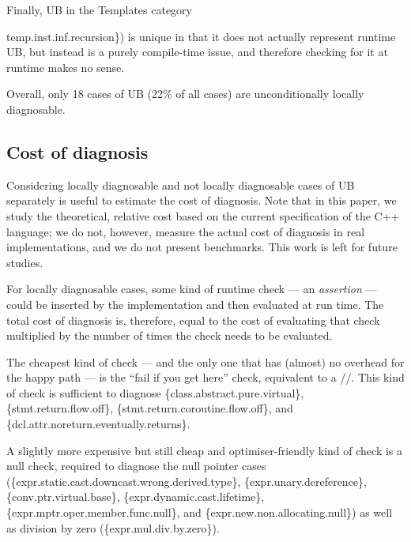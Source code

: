 Finally, UB in the Templates category {temp.inst.inf.recursion\}) is unique in that it does not actually represent runtime UB, but instead is a purely compile-time issue, and therefore checking for it at runtime makes no sense.

Overall, only 18 cases of UB (22\% of all cases) are unconditionally locally diagnosable.

\subsection{Cost of diagnosis}
\label{cost}

Considering locally diagnosable and not locally diagnosable cases of UB separately is useful to estimate the cost of diagnosis. Note that in this paper, we study the theoretical, relative cost based on the current specification of the C++ language; we do not, however, measure the actual cost of diagnosis in real implementations, and we do not present benchmarks. This work is left for future studies. %

For locally diagnosable cases, some kind of runtime check --- an \emph{assertion} --- could be inserted by the implementation and then evaluated at run time. The total cost of diagnosis is, therefore, equal to the cost of evaluating that check multiplied by the number of times the check needs to be evaluated.

The cheapest kind of check --- and the only one that has (almost) no overhead for the happy path --- is the ``fail if you get here'' check, equivalent to a //. This kind of check is sufficient to diagnose \{class.abstract.pure.virtual\}, \{stmt.return.flow.off\}, \{stmt.return.coroutine.flow.off\}, and \{dcl.attr.noreturn.eventually.returns\}.

A slightly more expensive but still cheap and optimiser-friendly kind of check is a null check, required to diagnose the null pointer cases  
(\{expr.static.cast.downcast.wrong.derived.type\},
\{expr.unary.deref\-erence\},
\{conv.ptr.virtual.base\},
\{expr.dynamic.cast.lifetime\}, 
\{expr.mptr.oper.member.\linebreak[3]func.null\}, and
\{expr.new.non.allocating.null\})
as well as division by zero (\{expr.mul.div.by.zero\}).

}
